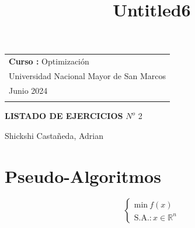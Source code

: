\documentclass[11pt]{article}
\title{Untitled6}
\begin{document}
    

    



\thispagestyle{empty} %

\begin{tabular}{p{15.5cm}} 
{\large \textbf{Curso :} Optimización} \\
Universidad Nacional Mayor de San Marcos \\ Junio 2024  \\
\hline %
\\
\end{tabular} %

\vspace*{0.2cm} %

\begin{center} %
	{\Large \textbf{LISTADO DE EJERCICIOS} \textit{$N^o$} 2} %
	\vspace{2mm}
	
        \begin{center}
     \vspace{0.3cm}
            {\large Shickshi Castañeda, Adrian}
            
        \end{center}
		
\end{center}  

\vspace{0.0cm}


\section*{Pseudo-Algoritmos}
\[
\begin{cases}
\text{min} \ f(x) \\[2ex]
\text{S.A.}: x \in \mathbb{R}^n
\end{cases}
\]
\end{document}
